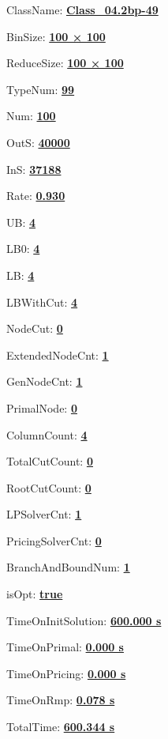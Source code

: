 \documentclass[11pt]{article}
\begin{document}
\pagestyle{empty}


ClassName: \underline{\textbf{Class_04.2bp-49}}
\par
BinSize: \underline{\textbf{100 × 100}}
\par
ReduceSize: \underline{\textbf{100 × 100}}
\par
TypeNum: \underline{\textbf{99}}
\par
Num: \underline{\textbf{100}}
\par
OutS: \underline{\textbf{40000}}
\par
InS: \underline{\textbf{37188}}
\par
Rate: \underline{\textbf{0.930}}
\par
UB: \underline{\textbf{4}}
\par
LB0: \underline{\textbf{4}}
\par
LB: \underline{\textbf{4}}
\par
LBWithCut: \underline{\textbf{4}}
\par
NodeCut: \underline{\textbf{0}}
\par
ExtendedNodeCnt: \underline{\textbf{1}}
\par
GenNodeCnt: \underline{\textbf{1}}
\par
PrimalNode: \underline{\textbf{0}}
\par
ColumnCount: \underline{\textbf{4}}
\par
TotalCutCount: \underline{\textbf{0}}
\par
RootCutCount: \underline{\textbf{0}}
\par
LPSolverCnt: \underline{\textbf{1}}
\par
PricingSolverCnt: \underline{\textbf{0}}
\par
BranchAndBoundNum: \underline{\textbf{1}}
\par
isOpt: \underline{\textbf{true}}
\par
TimeOnInitSolution: \underline{\textbf{600.000 s}}
\par
TimeOnPrimal: \underline{\textbf{0.000 s}}
\par
TimeOnPricing: \underline{\textbf{0.000 s}}
\par
TimeOnRmp: \underline{\textbf{0.078 s}}
\par
TotalTime: \underline{\textbf{600.344 s}}
\par
\newpage
\end{document}
